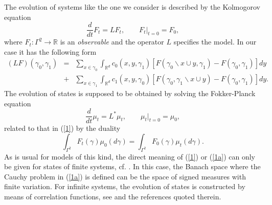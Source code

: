 \documentclass[reqno,11pt]{amsart}
\theoremstyle{definition}
\theoremstyle{remark}
\numberwithin{equation}{section}
\begin{document}
The evolution of systems like the one we consider is described by
the Kolmogorov equation
\begin{equation}
  \label{1}
 \frac{d}{dt} F_t = L F_t, \qquad F_t|_{t=0} = F_0,
\end{equation}
where $F_t:\Gamma^2\to\mathds{R}$ is an {\it observable} and the
operator $L$ specifies the model. In our case it has the following
form
\begin{eqnarray}\label{LF}
(LF)(\gamma_{0},\gamma_{1}) &= &\sum_{x\in
\gamma_{0}}\int_{\mathds{R}^d} c_{0}(x,y,\gamma_{1})
[F(\gamma_{0}\backslash x \cup
y,\gamma_{1})-F(\gamma_{0},\gamma_{1})]d y \qquad \\[.2cm] &+ & \sum_{x\in
\gamma_{1}}\int_{\mathds{R}^d} c_{1}(x,y,\gamma_{0})
[F(\gamma_{0},\gamma_{1}\backslash x \cup
y)-F(\gamma_{0},\gamma_{1})]d y. \nonumber
\end{eqnarray}
The evolution of states is supposed to be obtained by solving the
Fokker-Planck equation
\begin{equation}
  \label{1a}
\frac{d}{dt} \mu_t = L^* \mu_t, \qquad \mu_t|_{t=0} = \mu_0,
\end{equation}
related to that in (\ref{1}) by the duality
\begin{equation}
  \label{1b}
  \int_{\Gamma^2}F_t (\gamma) \mu_0 ( d \gamma) = \int_{\Gamma^2}F_0 (\gamma) \mu_t ( d
  \gamma).
\end{equation}
As is usual for models of this kind, the direct meaning of (\ref{1})
or (\ref{1a}) can only be given for states of finite systems, cf.
\cite{K}. In this case, the Banach space where the Cauchy problem in
(\ref{1a}) is defined can be the space of signed measures with
finite variation. For infinite systems, the evolution of states is
constructed by means of correlation functions, see
\cite{BKKK,FKKK,FKKO,FKO,FKO1,KK} and the references quoted therein.
\end{document}
